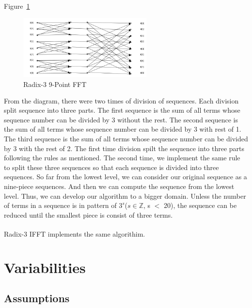 \documentclass[12pt]{article}
\begin{document}
Figure~\ref{Fig_Radix-3FFT}

\begin{figure}[h!]
\begin{center}
 \includegraphics[width=0.6\textwidth]{butterflyRedix3}
\caption{Radix-3 9-Point FFT}
\label{Fig_Radix-3FFT}
\end{center}
\end{figure}

From the diagram, there were two times of division of sequences. Each division split sequence into three parts. The first sequence is the sum of all terms whose sequence number can be divided by 3 without the rest. The second sequence is the sum of all terms whose sequence number can be divided by 3 with rest of 1. The third sequence is the sum of all terms whose sequence number can be divided by 3 with the rest of 2. The first time division spilt the sequence into three parts following the rules as mentioned. The second time, we implement the same rule to split these three sequences so that each sequence is divided into three sequences. So far from the lowest level, we can consider our original sequence as a nine-piece sequences. And then we can compute the sequence from the lowest level. Thus, we can develop our algorithm to a bigger domain. Unless the number of terms
in a sequence is in pattern of  $3^s$($s\in\mathbb{Z}$, s $<$ 20), the sequence can be reduced until the smallest piece is consist of three terms.\\
\\
Radix-3 IFFT implements the same algorithim.\\



\section{Variabilities}

\subsection{Assumptions}
\end{document}
